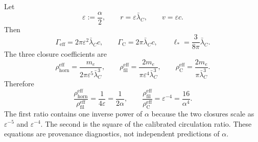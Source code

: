 \documentclass[aps,pre,preprint,notitlepage,nofootinbib,superscriptaddress]{revtex4-2}
\newcommand{\lC}{\bar\lambda_C}
\newcommand{\rhohorn}{\rho_{\mathrm{horn}}^{\mathrm{eff}}}
\newcommand{\rhofil}{\rho_{\mathrm{fil}}^{\mathrm{eff}}}
\newcommand{\rhoCeff}{\rho_{\mathrm C}^{\mathrm{eff}}}
\newcommand{\Gammaeff}{\Gamma_{\mathrm{eff}}}
\newcommand{\GammaC}{\Gamma_{\mathrm C}}
\begin{document}
Let
\[
\varepsilon:=\frac{\alpha}{2},
\qquad
r=\varepsilon\lC,
\qquad
v=\varepsilon c.
\]
Then
\begin{equation}
  \Gammaeff
  =
  2\pi\varepsilon^2\lC c,
  \qquad
  \GammaC
  =
  2\pi\lC c,
  \qquad
  \ell_*=\frac{3}{8\pi}\lC.
\end{equation}
The three closure coefficients are
\begin{equation}
  \rhohorn
  =
  \frac{m_e}{2\pi\varepsilon^5\lC^3},
  \qquad
  \rhofil
  =
  \frac{2m_e}{\pi\varepsilon^4\lC^3},
  \qquad
  \rhoCeff
  =
  \frac{2m_e}{\pi\lC^3}.
\end{equation}
Therefore
\begin{equation}
  \frac{\rhohorn}{\rhofil}
  =
  \frac{1}{4\varepsilon}
  =
  \frac{1}{2\alpha},
  \qquad
  \frac{\rhofil}{\rhoCeff}
  =
  \varepsilon^{-4}
  =
  \frac{16}{\alpha^4}.
\end{equation}
The first ratio contains one inverse power of \(\alpha\) because the two closures scale as \(\varepsilon^{-5}\) and \(\varepsilon^{-4}\).  The second is the square of the calibrated circulation ratio.  These equations are provenance diagnostics, not independent predictions of \(\alpha\).
\end{document}
